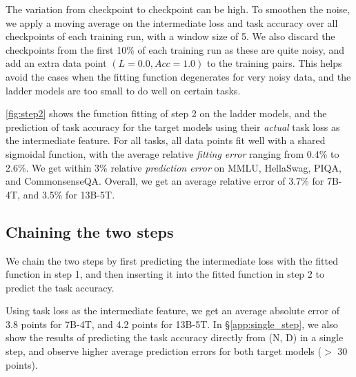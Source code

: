 The variation from checkpoint to checkpoint can be high. To smoothen the noise, we apply a moving average on the intermediate loss and task accuracy over all checkpoints of each training run, with a window size of 5. We also discard the checkpoints from the first 10\% of each training run as these are quite noisy, and add an extra data point $(L=0.0, Acc=1.0)$ to the training pairs. This helps avoid the cases when the fitting function degenerates for very noisy data, and the ladder models are too small to do well on certain tasks.


\autoref{fig:step2} shows the function fitting of step 2 on the ladder models, and the prediction of task accuracy for the target models using their \textit{actual} task loss as the intermediate feature.
For all tasks, all data points fit well with a shared sigmoidal function, with the average relative \textit{fitting error} ranging from 0.4\% to 2.6\%.
We get within 3\% relative \textit{prediction error} on MMLU, HellaSwag, PIQA, and CommonsenseQA.
Overall, we get an average relative error of 3.7\% for 7B-4T, and 3.5\% for 13B-5T.

\subsection{Chaining the two steps}
\label{sec:nd_to_acc}

We chain the two steps by first predicting the intermediate loss with the fitted function in step 1, and then inserting it into the fitted function in step 2 to predict the task accuracy.

Using task loss as the intermediate feature, we get an average absolute error of 3.8 points for 7B-4T, and 4.2 points for 13B-5T.
In \S\ref{app:single_step}, we also show the results of predicting the task accuracy directly from (N, D) in a single step, and observe higher average prediction errors for both target models ($>$ 30 points). 
